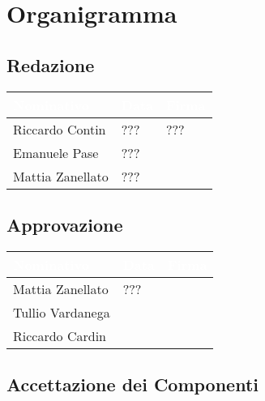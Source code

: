 \chapter{Organigramma}
\renewcommand\arraystretch{2,3}

\section{Redazione}

\begin{center}
  \centering
  \begin{longtable}{|C{3,5cm}|C{2cm}|C{6,5cm}|}
    \hline
    \textcolor[HTML]{FFFFFF}{\textbf{Nominativo}} & \textcolor[HTML]{FFFFFF}{\textbf{Data}} & \textcolor[HTML]{FFFFFF}{\textbf{Firma}} \\ \hline
    Riccardo Contin & ??? & ??? \\ \hline
    Emanuele Pase & ??? &  \\ \hline
    Mattia Zanellato & ??? &  \\ \hline
  \end{longtable}
\end{center}

\section{Approvazione}

\begin{center}
  \centering
  \begin{longtable}{|C{3,5cm}|C{2cm}|C{6,5cm}|}
    \hline
    \textcolor[HTML]{FFFFFF}{\textbf{Nominativo}} & \textcolor[HTML]{FFFFFF}{\textbf{Data}} & \textcolor[HTML]{FFFFFF}{\textbf{Firma}} \\ \hline
    Mattia Zanellato & ??? &  \\ \hline
    Tullio Vardanega &  &  \\ \hline
    Riccardo Cardin &  &  \\ \hline
  \end{longtable}
\end{center}

\section{Accettazione dei Componenti}


